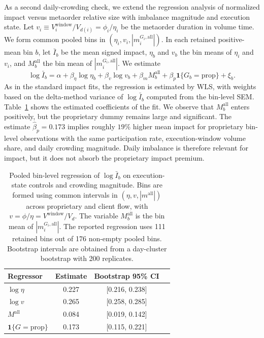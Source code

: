 \documentclass[11pt]{article}
\begin{document}
As a second daily-crowding check, we extend the regression analysis of normalized
impact versus metaorder relative size with imbalance magnitude and execution
state. Let \(v_i \equiv V_i^{\text{window}}/V_{d(i)} = \phi_i/\eta_i\) be the
metaorder duration in volume time. We form common pooled bins in
\((\eta_i, v_i, |m_i^{G_i,\mathrm{all}}|)\). In each retained positive-mean bin
\(b\), let \(\bar I_b\) be the mean signed impact, \(\eta_b\) and \(v_b\) the bin
means of \(\eta_i\) and \(v_i\), and
\(M_b^{\mathrm{all}}\) the bin mean of \(|m_i^{G_i,\mathrm{all}}|\). We estimate
\begin{equation}
  \log \bar I_b
  =
  \alpha
  + \beta_{\eta}\log \eta_b
  + \beta_v \log v_b
  + \beta_m M_b^{\mathrm{all}}
  + \beta_p \mathbf{1}\{G_b=\mathrm{prop}\}
  + \xi_b.
\end{equation}
As in the standard impact fits, the regression is estimated by WLS, with weights
based on the delta-method variance of \(\log \bar I_b\) computed from the
bin-level SEM. Table~\ref{tab:crowding_impact_pooled} shows the estimated
coefficients of the fit. We observe that \(M_b^{\mathrm{all}}\) enters
positively, but the proprietary dummy remains large and significant. The
estimate \(\hat\beta_p=0.173\) implies roughly \(19\%\) higher mean impact for
proprietary bin-level observations with the same participation rate,
execution-window volume share, and daily crowding magnitude. Daily imbalance is
therefore relevant for impact, but it does not absorb the proprietary impact
premium.

\begin{table}[t]
\centering
\scriptsize
\setlength{\tabcolsep}{4pt}
\begin{tabular}{@{}lccc@{}}
\toprule
Regressor & Estimate & Bootstrap 95\% CI \\
\midrule
\(\log \eta\) & 0.227 &  [0.216, 0.238] \\
\(\log v\) & 0.265 &  [0.258, 0.285] \\
\(M^{\mathrm{all}}\) & 0.084 &  [0.019, 0.142] \\
\(\mathbf{1}\{G=\mathrm{prop}\}\) & 0.173 &  [0.115, 0.221] \\
\bottomrule
\end{tabular}
\caption{Pooled bin-level regression of \(\log \bar I_b\) on execution-state
controls and crowding magnitude. Bins are formed using common intervals in
\((\eta, v, |m^{\mathrm{all}}|)\) across proprietary and client flow, with
\(v=\phi/\eta = V^{\text{window}}/V_d\). The variable \(M_b^{\mathrm{all}}\) is
the bin mean of \(|m_i^{G_i,\mathrm{all}}|\). The reported regression uses 111
retained bins out of 176 non-empty pooled bins. Bootstrap intervals are obtained
from a day-cluster bootstrap with 200 replicates.}
\label{tab:crowding_impact_pooled}
\end{table}
\end{document}
